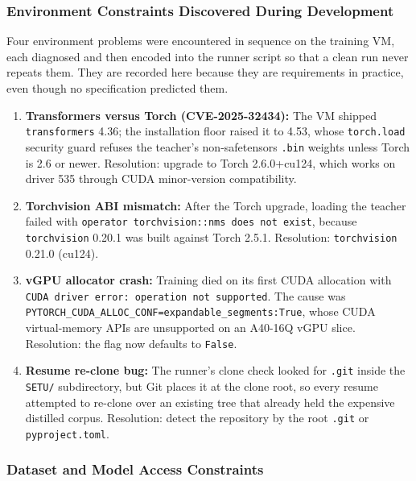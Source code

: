 \subsubsection{Environment Constraints Discovered During Development}

Four environment problems were encountered in sequence on the training VM, each
diagnosed and then encoded into the runner script so that a clean run never
repeats them. They are recorded here because they are requirements in practice,
even though no specification predicted them.

\begin{enumerate}[leftmargin=0.75in]
  \item \textbf{Transformers versus Torch (CVE-2025-32434):} The VM shipped
        \texttt{transformers} 4.36; the installation floor raised it to 4.53,
        whose \texttt{torch.load} security guard refuses the teacher's
        non-safetensors \texttt{.bin} weights unless Torch is 2.6 or newer.
        Resolution: upgrade to Torch 2.6.0+cu124, which works on driver 535
        through CUDA minor-version compatibility.
  \item \textbf{Torchvision ABI mismatch:} After the Torch upgrade, loading the
        teacher failed with \texttt{operator torchvision::nms does not exist},
        because \texttt{torchvision} 0.20.1 was built against Torch 2.5.1.
        Resolution: \texttt{torchvision} 0.21.0 (cu124).
  \item \textbf{vGPU allocator crash:} Training died on its first CUDA
        allocation with \texttt{CUDA driver error: operation not supported}. The
        cause was \texttt{PYTORCH\_CUDA\_ALLOC\_CONF=expandable\_segments:True},
        whose CUDA virtual-memory APIs are unsupported on an A40-16Q vGPU slice.
        Resolution: the flag now defaults to \texttt{False}.
  \item \textbf{Resume re-clone bug:} The runner's clone check looked for
        \texttt{.git} inside the \texttt{SETU/} subdirectory, but Git places it
        at the clone root, so every resume attempted to re-clone over an existing
        tree that already held the expensive distilled corpus. Resolution: detect
        the repository by the root \texttt{.git} or \texttt{pyproject.toml}.
\end{enumerate}

\subsubsection{Dataset and Model Access Constraints}

